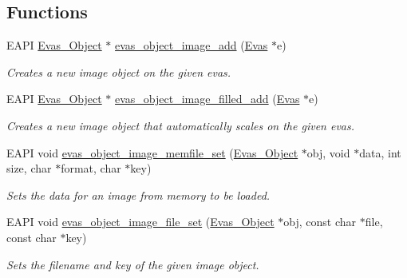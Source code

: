 \subsection*{Functions}
\begin{DoxyCompactItemize}
\item 
EAPI \hyperlink{group__Evas__Object__Group_ga9e19e6dd1f517a0ba437c0114d3e7c97}{Evas\_\-Object} $\ast$ \hyperlink{group__Evas__Object__Image_gae2bf7d73874a8b11ac4d7cb3bf2476ce}{evas\_\-object\_\-image\_\-add} (\hyperlink{group__Evas__Canvas_ga5ff87cc4ce6bc43e3b640a6d37f73043}{Evas} $\ast$e)
\begin{DoxyCompactList}\small\item\em Creates a new image object on the given evas. \item\end{DoxyCompactList}\item 
EAPI \hyperlink{group__Evas__Object__Group_ga9e19e6dd1f517a0ba437c0114d3e7c97}{Evas\_\-Object} $\ast$ \hyperlink{group__Evas__Object__Image_ga2e4275b1aee95e338ffa8b39e81f4eee}{evas\_\-object\_\-image\_\-filled\_\-add} (\hyperlink{group__Evas__Canvas_ga5ff87cc4ce6bc43e3b640a6d37f73043}{Evas} $\ast$e)
\begin{DoxyCompactList}\small\item\em Creates a new image object that automatically scales on the given evas. \item\end{DoxyCompactList}\item 
EAPI void \hyperlink{group__Evas__Object__Image_ga58846bf7f00892e6985264ea2681d73a}{evas\_\-object\_\-image\_\-memfile\_\-set} (\hyperlink{group__Evas__Object__Group_ga9e19e6dd1f517a0ba437c0114d3e7c97}{Evas\_\-Object} $\ast$obj, void $\ast$data, int size, char $\ast$format, char $\ast$key)
\begin{DoxyCompactList}\small\item\em Sets the data for an image from memory to be loaded. \item\end{DoxyCompactList}\item 
EAPI void \hyperlink{group__Evas__Object__Image_ga70f63c055b2e248089e761f5c0f78a0f}{evas\_\-object\_\-image\_\-file\_\-set} (\hyperlink{group__Evas__Object__Group_ga9e19e6dd1f517a0ba437c0114d3e7c97}{Evas\_\-Object} $\ast$obj, const char $\ast$file, const char $\ast$key)
\begin{DoxyCompactList}\small\item\em Sets the filename and key of the given image object. \item\end{DoxyCompactList}\item 

\end{DoxyCompactItemize}
